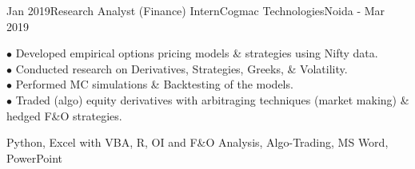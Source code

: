 \vspace*{-15px} 
\begin{experiences}
   \experience
    {Jan 2019}{Research Analyst (Finance) Intern}{Cogmac Technologies}{Noida}
    {- Mar 2019}
    {
\begin{description}
    $\bullet$ Developed empirical options pricing models \& strategies using Nifty data. 
    \\$\bullet$ Conducted research on Derivatives, Strategies, Greeks, \& Volatility. 
    \\$\bullet$ Performed MC simulations \& Backtesting of the models. 
    \\$\bullet$ Traded (algo) equity derivatives with arbitraging techniques (market making) \& hedged F\&O strategies.
    \end{description}
    }
{Python, Excel with VBA, R, OI and F\&O Analysis, Algo-Trading,  MS Word, PowerPoint}
\end{experiences}

